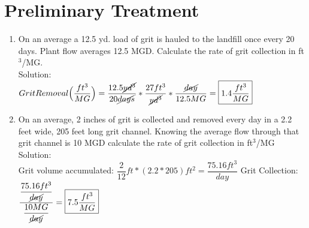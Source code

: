 \section{Preliminary Treatment}
\begin{enumerate}
\item On an average a 12.5 yd. load of grit is hauled to the landfill once every 20 days. Plant flow averages 12.5 MGD. Calculate the rate of grit collection in ft$^3$/MG.\\
Solution:\\
$Grit Removal\Big(\dfrac{ft^3}{MG}\Big)=\dfrac{12.5\cancel{yd^3}}{ 20\cancel{days}}*\dfrac{27ft^3}{ \cancel{yd^3}}*\dfrac{\cancel{day}}{12.5MG}=\boxed{1.4\dfrac{ft^3}{MG}}$

\item On an average, 2 inches of grit is collected and removed every day in a 2.2 feet wide, 205 feet long grit channel.  Knowing the average flow through that grit channel is 10 MGD calculate the rate of grit collection in ft$^3$/MG\\
Solution:\\
Grit volume accumulated:  $\dfrac{2}{12}ft*(2.2*205)ft^2=\dfrac{75.16ft^3}{day}$
Grit Collection: $\dfrac{\dfrac{75.16ft^3}{\cancel{day}}}{\dfrac{10MG}{\cancel{day}}}=\boxed{7.5\dfrac{ft^3}{MG}}$ 
\end{enumerate}

